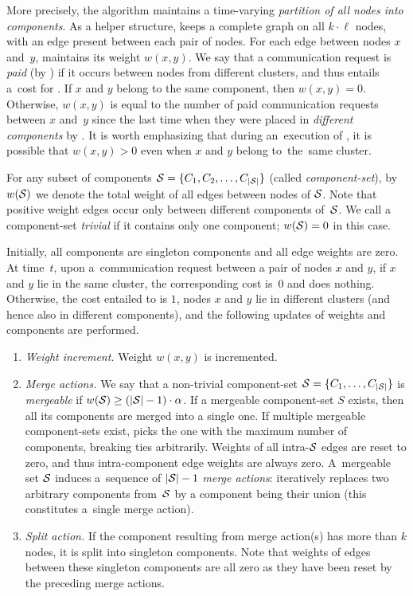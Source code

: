 More precisely, the algorithm maintains a time-varying \emph{partition of all
nodes into components}. As a helper structure, \CREP keeps a complete graph on
all $k \cdot \ell$ nodes, with an edge present between each pair of nodes. For
each edge between nodes $x$ and~$y$, \CREP maintains its weight $w(x,y)$. We
say that a communication request is \emph{paid} (by \CREP) if it occurs
between nodes from different clusters, and thus entails a~cost for \CREP. If
$x$ and $y$ belong to the same component, then $w(x,y) = 0$. Otherwise,
$w(x,y)$ is equal to the number of paid communication requests between $x$
and~$y$ since the last time when they were placed in \emph{different components} 
by \CREP. It is worth emphasizing that during an~execution of \CREP, it is
possible that $w(x,y) > 0$ even when $x$ and $y$ belong to~the~same cluster.

For any subset of components $\mathcal{S} = \{ C_1, C_2, \ldots, C_{|\mathcal{S}|} \}$ (called
\emph{component-set}), by~$w(\mathcal{S})$ we denote the total weight of all edges
between nodes of $\mathcal{S}$. Note that positive weight edges occur only between
different components of~$\mathcal{S}$. We call a component-set \emph{trivial} if it
contains only one component; $w(\mathcal{S}) = 0$ in this case.

Initially, all components are singleton components and all edge weights are
zero. At time~$t$, upon a~communication request between a pair of nodes $x$
and $y$, if $x$ and $y$ lie in the same cluster, the corresponding cost is~$0$
and \CREP does nothing. Otherwise, the cost entailed to \CREP is $1$, nodes
$x$ and $y$ lie in different clusters (and hence also in different
components), and the following updates of weights and components are
performed.

\pagebreak

\begin{enumerate}

\item \emph{Weight increment.} Weight $w(x,y)$ is incremented.

\item \emph{Merge actions.} We say that a non-trivial component-set $\mathcal{S} = \{
C_1, \ldots, C_{|\mathcal{S}|} \}$ is \emph{mergeable} if $w(\mathcal{S}) \geq
(|\mathcal{S}|-1) \cdot \alpha$. If a mergeable component-set $S$ exists, then all its
components are merged into a single one. If multiple mergeable component-sets
exist, \CREP picks the one with the maximum number of components, breaking ties
arbitrarily. Weights of all intra-$\mathcal{S}$ edges are reset to zero, and thus
intra-component edge weights are always zero. A~mergeable set $\mathcal{S}$ induces
a~sequence of $|\mathcal{S}|-1$ \emph{merge actions}:
\CREP iteratively replaces two arbitrary components 
from~$\mathcal{S}$ by a component being their union (this constitutes a~single merge
action).

\item \emph{Split action.} If the component resulting from merge action(s)
has more than $k$ nodes, it is split into singleton
components. Note that weights of edges between these singleton components are
all zero as they have been reset by the preceding merge actions.

\end{enumerate}

